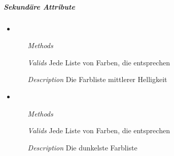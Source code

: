 
\newpage

\subparagraph{Sekund\"are Attribute}
\begin{itemize}

\item {}
\begin{enumerate}
\item[\textit{Methods}] 
\item[\textit{Valids}] Jede Liste von Farben, die 
 entsprechen
\item[\textit{Description}] Die Farbliste mittlerer Helligkeit
\end{enumerate}

\item {}
\begin{enumerate}
\item[\textit{Methods}] 
\item[\textit{Valids}] Jede Liste von Farben, die 
 entsprechen
\item[\textit{Description}] Die dunkelste Farbliste
\end{enumerate}

\end{itemize}


\newpage

